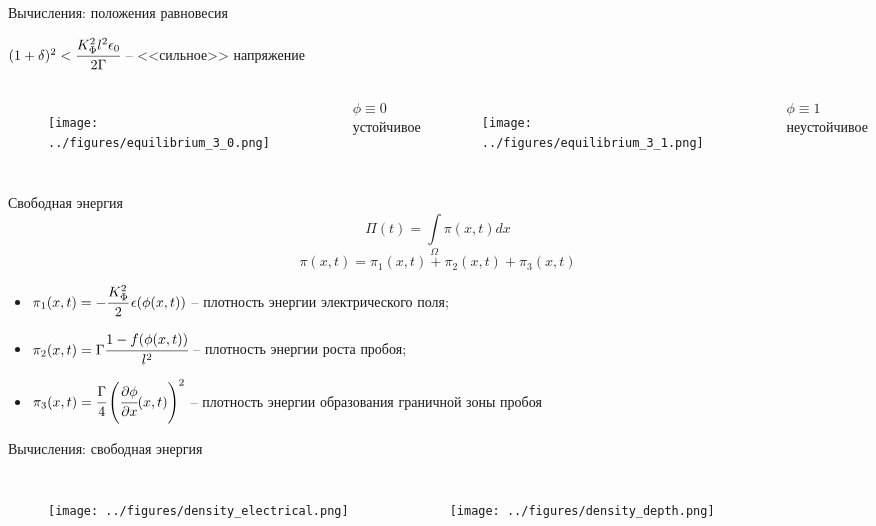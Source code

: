 \documentclass[aspectratio=169]{beamer}
\begin{document}
\begin{frame}{Вычисления: положения равновесия}
\vspace{-0.4cm}
\begin{center}
	$(1 + \delta)^2 < \cfrac{K_\Phi^2 l^2 \epsilon_0}{2 \Gamma}$ -- <<сильное>> напряжение
\end{center}
\vspace{-0.4cm}
\begin{columns}
\begin{figure}
	\texttt{[image: ../figures/equilibrium\_3\_0.png]}
\end{figure}
\vspace{-0.6cm}
\begin{center}
	$\phi \equiv 0$ \\
	устойчивое
\end{center}
\begin{figure}
	\texttt{[image: ../figures/equilibrium\_3\_1.png]}
\end{figure}
\vspace{-0.6cm}
\begin{center}
	$\phi \equiv 1$ \\
	неустойчивое
\end{center}
\end{columns}
\end{frame}


\begin{frame}{Свободная энергия}
\vspace{-0.5cm}
$$\Pi(t) = \int\limits_\Omega \pi(x, t) dx$$
$$\pi(x, t) = \pi_1(x, t) + \pi_2(x, t) + \pi_3(x, t)$$
\vspace{-0.3cm}
\begin{itemize}
	\item $\pi_1(x, t) = -\cfrac{K_\Phi^2}{2} \, \epsilon(\phi(x, t))$ -- плотность энергии
	электрического поля;
	\item $\pi_2(x, t) = \Gamma \cfrac{1 - f(\phi(x, t))}{l^2}$ -- плотность энергии роста пробоя;
	\item $\pi_3(x, t) = \cfrac{\Gamma}{4} \left( \cfrac{\partial \phi}{\partial x}(x, t)
	\right)^2$ -- плотность энергии образования граничной зоны пробоя
\end{itemize}
\end{frame}


\begin{frame}{Вычисления: свободная энергия}
\vspace{-0.8cm}
\begin{columns}
\begin{figure}
	\texttt{[image: ../figures/density\_electrical.png]}
\end{figure}
\begin{figure}
	\texttt{[image: ../figures/density\_depth.png]}
\end{figure}
\end{columns}
\end{frame}
\end{document}
